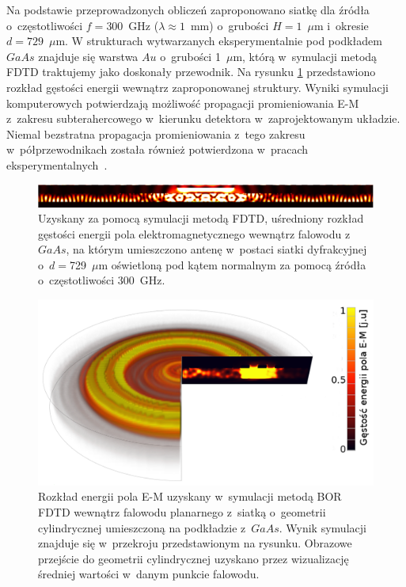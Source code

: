 Na podstawie przeprowadzonych obliczeń zaproponowano siatkę dla źródła o~częstotliwości $f=300$~GHz ($\lambda\approx 1$~mm) o~grubości $H=1$~$\mu$m i~okresie $d=729$~$\mu$m. W strukturach wytwarzanych eksperymentalnie pod podkładem $GaAs$ znajduje się warstwa $Au$ o~grubości 1~$\mu$m, którą w~symulacji metodą FDTD traktujemy jako doskonały przewodnik. Na rysunku \ref{fig:consrc_1d_f300Ghz} przedstawiono rozkład gęstości energii wewnątrz zaproponowanej struktury. Wyniki symulacji komputerowych potwierdzają  możliwość propagacji promieniowania E-M z~zakresu subterahercowego w~kierunku detektora w~zaprojektowanym układzie. Niemal bezstratna propagacja promieniowania z~tego zakresu w~półprzewodnikach została również potwierdzona w~pracach eksperymentalnych~\cite{roux2002grating}.

\begin{figure}[tb]
	\includegraphics[width=\textwidth]{images/thz/consrc_siatka1d_300GHz_d729um.png}
	\caption{Uzyskany za pomocą symulacji metodą FDTD, uśredniony rozkład gęstości energii pola elektromagnetycznego wewnątrz falowodu z~$GaAs$, na którym umieszczono antenę w~postaci siatki dyfrakcyjnej o~$d=$729~$\mu$m oświetloną pod kątem normalnym za pomocą źródła o~częstotliwości 300~GHz.  }
	\label{fig:consrc_1d_f300Ghz}
\end{figure}

\begin{figure}[tb]
	\includegraphics[width=\textwidth]{images/antenaThz/tort.png}
	\caption{Rozkład energii pola E-M uzyskany w~symulacji metodą BOR FDTD wewnątrz falowodu planarnego z~siatką o~geometrii cylindrycznej umieszczoną na podkładzie z~$GaAs$. Wynik symulacji znajduje się w~przekroju przedstawionym na rysunku. Obrazowe przejście do geometrii cylindrycznej uzyskano przez wizualizację średniej wartości w~danym punkcie falowodu.}	
	\label{fig:concent_modfalo}
\end{figure}

